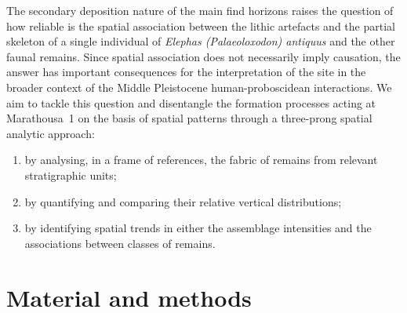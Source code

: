 \documentclass[review,authoryear,times]{elsarticle} %
\begin{document}
The secondary deposition nature of the main find horizons raises the question of how reliable is the spatial association between the lithic artefacts and the partial skeleton of a single individual of \emph{Elephas (Palaeoloxodon) antiquus} and the other faunal remains. Since spatial association does not necessarily imply causation, the answer has important consequences for the interpretation of the site in the broader context of the Middle Pleistocene human-proboscidean interactions. We aim to tackle this question and disentangle the formation processes acting at Marathousa~1 on the basis of spatial patterns through a three-prong spatial analytic approach:
\begin{enumerate}
\item by analysing, in a frame of references, the fabric of remains from relevant stratigraphic units;
\item by quantifying and comparing their relative vertical distributions;
\item by identifying spatial trends in either the assemblage intensities and the associations between classes of remains.
\end{enumerate}

\section{Material and methods}
\end{document}
